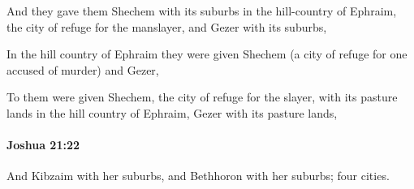 			\begin{versebox}
					\item[BHS] 
					\item[ASV] And they gave them Shechem with its suburbs in the hill-country of Ephraim, the city of refuge for the manslayer, and Gezer with its suburbs,
					\item[NIV] In the hill country of Ephraim they were given Shechem (a city of refuge for one accused of murder) and Gezer,
					\item[NRSV] To them were given Shechem, the city of refuge for the slayer, with its pasture lands in the hill country of Ephraim, Gezer with its pasture lands,
			\end{versebox}

		\paragraph{Joshua 21:22} %
			\label{JOSHUA-21-22}

			And Kibzaim with her suburbs, and Bethhoron with her suburbs; four cities.

